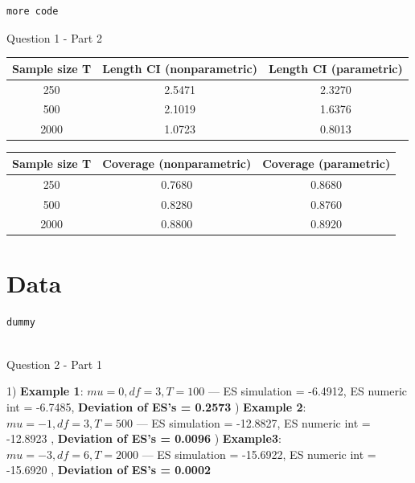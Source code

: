 \documentclass[12pt]{article}
\begin{document}
\begin{Program}[!htb]
\begin{lstlisting}[style=Matlab-editor,basicstyle=\mlttfamily\footnotesize]
more code 
\end{lstlisting}
\caption{Question 1 - Part 2}
\label{Question 1 - Part 2}
\end{Program}


\begin{center}
\begin{tabular}{||c | c c||} 
 \hline
 Sample size T & Length CI (nonparametric) & Length CI (parametric) \\ [0.5ex] 
 \hline\hline
 250 & 2.5471 & 2.3270 \\ 
 \hline
 500 & 2.1019 & 1.6376 \\
 \hline
 2000 & 1.0723 & 0.8013 \\ [1ex] 
 \hline
\end{tabular}
\end{center}
\vspace{3pt}
\begin{center}
\begin{tabular}{||c | c c||} 
 \hline
 Sample size T & Coverage (nonparametric) & Coverage (parametric) \\ [0.5ex] 
 \hline\hline
 250 & 0.7680 & 0.8680 \\ 
 \hline
 500 & 0.8280 & 0.8760 \\
 \hline
 2000 & 0.8800 & 0.8920 \\ [1ex] 
 \hline
\end{tabular}
\end{center}
\vspace{15pt}

\section{Data}

\begin{Program}[!htb]
\begin{lstlisting}[style=Matlab-editor,basicstyle=\mlttfamily\footnotesize]
dummy
  
\end{lstlisting}
\caption{Question 2 - Part 1}
\label{Question 2 - Part 1}
\end{Program}


1) \textbf{Example 1}: $mu = 0, df = 3, T = 100$     \newline ---     ES simulation = -6.4912, ES numeric int = -6.7485,  \textbf{Deviation of ES's = 0.2573}  ) \textbf{Example 2}: $mu = -1, df =3, T = 500$ \newline --- ES simulation = -12.8827, ES numeric int = -12.8923 , \textbf{Deviation of ES's = 0.0096} ) \textbf{Example3}: $mu = -3, df = 6, T = 2000$  \newline--- ES simulation = -15.6922, ES numeric int = -15.6920 , \textbf{Deviation of ES's = 0.0002}\newline\newline
\end{document}
